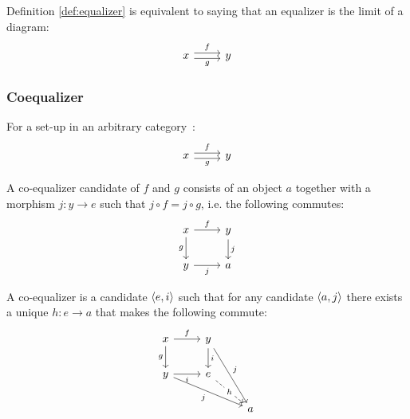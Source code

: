 \begin{definition}
  Definition \ref{def:equalizer} is equivalent to saying that an equalizer is
  the limit of a diagram:
  \[\begin{tikzcd}[ampersand replacement=\&]
    x \& y
    \arrow["f", shift left=1, from=1-1, to=1-2]
    \arrow["g"', shift right=1, from=1-1, to=1-2]
  \end{tikzcd}\]
\end{definition}

\subsubsection*{Coequalizer}

\begin{definition}
  For a set-up in an arbitrary
  category~\parencite{leinster:basic_category_theory}:
  \[\begin{tikzcd}[ampersand replacement=\&]
    x \& y
    \arrow["f", shift left=1, from=1-1, to=1-2]
    \arrow["g"', shift right=1, from=1-1, to=1-2]
  \end{tikzcd}\]

  A co-equalizer candidate of $f$ and $g$ consists of an object $a$ together
  with a morphism $j:y\to e$ such that $j\circ f = j\circ g$, i.e. the following
  commutes:
  \[\begin{tikzcd}[ampersand replacement=\&]
    x \& y \\
    y \& a
    \arrow["j"', from=2-1, to=2-2]
    \arrow["g"', from=1-1, to=2-1]
    \arrow["f", from=1-1, to=1-2]
    \arrow["j", from=1-2, to=2-2]
  \end{tikzcd}\]

  A co-equalizer is a candidate $\langle e, i\rangle$ such that for any candidate $\langle a,
  j\rangle$ there exists a unique $h: e\to a$ that makes the following commute:
  \[\begin{tikzcd}[ampersand replacement=\&]
    x \& y \\
    y \& e \\
    \&\& a
    \arrow["i", from=1-2, to=2-2]
    \arrow["i"', from=2-1, to=2-2]
    \arrow["g"', from=1-1, to=2-1]
    \arrow["f", from=1-1, to=1-2]
    \arrow["j"', from=2-1, to=3-3]
    \arrow["j", from=1-2, to=3-3]
    \arrow["h"{description}, dashed, from=2-2, to=3-3]
  \end{tikzcd}\]
\end{definition}

